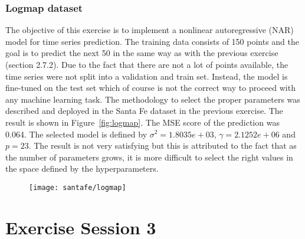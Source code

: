 \documentclass[conference,compsoc]{IEEEtran}
\begin{document}
\subsubsection{Logmap dataset}
The objective of this exercise is to implement a nonlinear autoregressive (NAR) model for time series prediction. The training data consists of 150 points and the goal is to predict the next 50 in the same way as with the previous exercise (section 2.7.2). Due to the fact that there are not a lot of points available, the time series were not split into a validation and train set. Instead, the model is fine-tuned on the test set which of course is not the correct way to proceed with any machine learning task. The methodology to select the proper parameters was described and deployed in the Santa Fe dataset in the previous exercise. The result is shown in Figure~\ref{fig:logmap}. The MSE score of the prediction was 0.064. The selected model is defined by $\sigma^2=1.8035e+03$, $\gamma=2.1252e+06$ and $p=23$. The result is not very satisfying but this is attributed to the fact that as the number of parameters grows, it is more difficult to select the right values in the space defined by the hyperparameters.


\begin{figure*}[]
\centering
        \begin{subfigure}{0.5\linewidth}
            \texttt{[image: santafe/logmap]}
            
       
      \end{subfigure}             
  \caption{Prediction on the Log map dataset}   
    \label{fig:logmap}
    \end{figure*}


\newpage


\section{Exercise Session 3}
\end{document}
